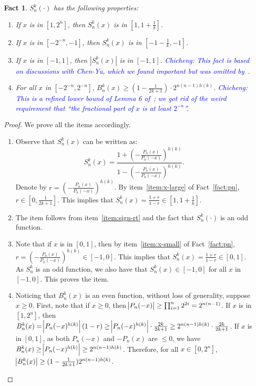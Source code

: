 \documentclass{article}
\newcommand{\cz}[1]{\textcolor{blue}{Chicheng: #1}}
\newtheorem{fact}[theorem]{Fact}
\begin{document}
\begin{fact}
$S_n^k(\cdot)$ has the following properties:
\begin{enumerate}
\item If $x$ is in $[1, 2^n]$, then $S_n^k(x)$ is in $[1, 1 + \frac 1 k]$. \label{item:sign-rt}
\item If $x$ is in $[-2^{-n}, -1]$, then $S_n^k(x)$ is in $[-1 - \frac 1 k, -1]$. \label{item:sign-lt}
\item If $x$ is in $[-1, 1]$, then $|S_n^k(x)|$ is in $[-1, 1]$. \label{item:sign-mid}
\cz{This fact is based on discussions with Chen-Yu, which we found important but was omitted by~\cite{klivans2004learning}.}
\item For all $x$ in $[-2^{-n}, 2^{-n}]$, $B_n^k(x) \geq (1-\frac{1}{2k+1}) \cdot 2^{n(n-1)h(k)}$.
\cz{This is a refined lower bound of Lemma 6 of~\cite{klivans2004learning}; we got rid of the weird
requirement that ``the fractional part of $x$ is at least $2^{-n}$''.}
\label{item:sign-denom}
\end{enumerate}
\label{fact:newman}
\end{fact}
\begin{proof}
We prove all the items accordingly.
\begin{enumerate}
\item Observe that $S_n^k(x)$ can be written as:
\[ S_n^k(x) = \frac{1 + (-\frac{P_n(x)}{P_n(-x)})^{h(k)}}{ 1 - (-\frac{P_n(x)}{P_n(-x)})^{h(k)} }.  \]
Denote by $r = (-\frac{P_n(x)}{P_n(-x)})^{h(k)}$. By item~\ref{item:x-large} of Fact~\ref{fact:pn}, $r \in [0, \frac{1}{2k+1}]$. This implies that
$S_n^k(x) = \frac{1+r}{1-r} \in [1, 1 + \frac 1 k]$.

\item The item follows from item~\ref{item:sign-rt} and the fact that $S_n^k(\cdot)$ is an odd function.

\item Note that if $x$ is in $[0, 1]$, then by item~\ref{item:x-small} of Fact~\ref{fact:pn}, $r = (-\frac{P_n(x)}{P_n(-x)})^{h(k)} \in [-1, 0]$. This implies that $S_n^k(x) = \frac{1+r}{1-r} \in [0,1]$. As $S_n^k$ is an odd function, we also have that $S_n^k(x) \in [-1, 0]$ for all $x$ in $[-1, 0]$. This proves the item.

\item Noticing that $B_n^k(x)$ is an even function, without loss of generality, suppose $x \geq 0$.
First, note that if $x \geq 0$, then $\abs{P_n(-x)} \geq \prod_{i=1}^n 2^{2i} = 2^{n(n-1)}$.
If $x$ is in $[1,2^n]$, then $B_n^k(x) = \abs{P_n(-x)^{h(k)}} (1 - r) \geq \abs{P_n(-x)^{h(k)}} \cdot \frac{2k}{2k+1} \geq 2^{n(n-1)h(k)} \cdot \frac{2k}{2k+1}$.
If $x$ is in $[0,1]$, as both $P_n(-x)$ and $-P_n(x)$ are $\leq 0$, we have $B_n^k(x) \geq \abs{P_n(-x)^{h(k)}} \geq 2^{n(n-1)h(k)}$. Therefore, for all $x \in [0,2^n]$,
$\abs{B_n^k(x)} \geq (1-\frac{1}{2k+1}) 2^{n(n-1)h(k)}$.
\end{enumerate}
\end{proof}
\end{document}
